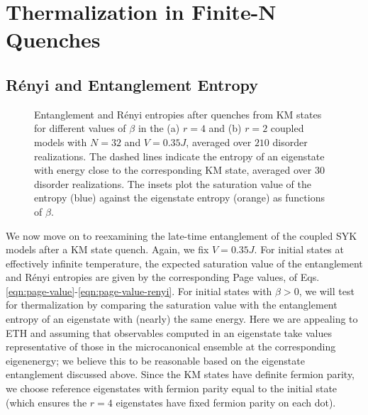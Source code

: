 \documentclass[reprint, floatfix,eqsecnum,superscriptaddress,preprint,nofootinbib,onecolumn,amsmath,amssymb,aps,prb]{revtex4-2}
\begin{document}
\section{Thermalization in Finite-N Quenches \label{sec:finite-N-quenches} }

\subsection{ R\'enyi and Entanglement Entropy \label{sec:finite-N-quench-entanglement} }

\begin{figure}%
 \caption{Entanglement and R\'enyi entropies after quenches from KM states for different values of $\beta$ in the (a) $r=4$ and (b) $r=2$ coupled models with $N=32$ and $V=0.35J$, averaged over $210$ disorder realizations. The dashed lines %
 indicate the entropy of an eigenstate with energy close to the corresponding KM state, averaged over $30$ disorder realizations. The insets plot the saturation value of the entropy (blue) against the eigenstate entropy (orange) as functions of $\beta$.  \label{fig:finiteN-KM-quench} } 
\end{figure}


We now move on to reexamining the late-time entanglement of the coupled SYK models after a KM state quench. 
Again, we fix $V=0.35J$. For initial states at effectively infinite temperature, 
the expected saturation value of the entanglement and R\'enyi entropies are given by the corresponding Page values, of Eqs. \eqref{eqn:page-value}-\eqref{eqn:page-value-renyi}. For initial states with $\beta > 0$, we will test for thermalization by comparing the saturation value with the entanglement entropy of an eigenstate with (nearly) the same energy. Here we are appealing to ETH and assuming that observables computed in an eigenstate take values representative of those in the microcanonical ensemble at the corresponding eigenenergy; we believe this to be reasonable based on the eigenstate entanglement discussed above. 
Since the KM states have definite fermion parity, we choose reference eigenstates with fermion parity equal to the initial state (which ensures the $r=4$ eigenstates have fixed fermion parity on each dot). 
\end{document}
